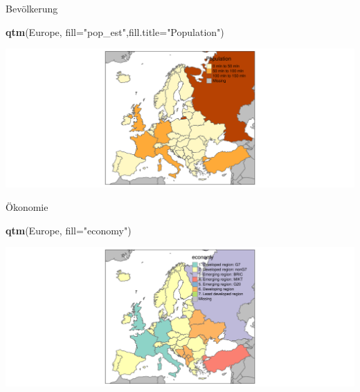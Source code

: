 \documentclass[ignorenonframetext,]{beamer}
\newenvironment{Shaded}{\begin{snugshade}}{\end{snugshade}}
\newcommand{\KeywordTok}[1]{\textcolor[rgb]{0.13,0.29,0.53}{\textbf{#1}}}
\newcommand{\DataTypeTok}[1]{\textcolor[rgb]{0.13,0.29,0.53}{#1}}
\newcommand{\StringTok}[1]{\textcolor[rgb]{0.31,0.60,0.02}{#1}}
\newcommand{\NormalTok}[1]{#1}
\begin{document}
\begin{frame}[fragile]{Bevölkerung}

\begin{Shaded}
\begin{Highlighting}[]
\KeywordTok{qtm}\NormalTok{(Europe, }\DataTypeTok{fill=}\StringTok{"pop_est"}\NormalTok{,}\DataTypeTok{fill.title=}\StringTok{"Population"}\NormalTok{) }
\end{Highlighting}
\end{Shaded}

\includegraphics{tmap_files/figure-beamer/unnamed-chunk-18-1.pdf}

\end{frame}

\begin{frame}[fragile]{Ökonomie}

\begin{Shaded}
\begin{Highlighting}[]
\KeywordTok{qtm}\NormalTok{(Europe, }\DataTypeTok{fill=}\StringTok{"economy"}\NormalTok{) }
\end{Highlighting}
\end{Shaded}

\includegraphics{tmap_files/figure-beamer/unnamed-chunk-20-1.pdf}

\end{frame}
\end{document}
